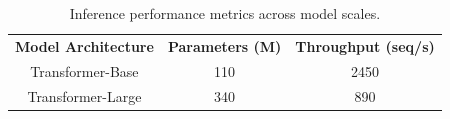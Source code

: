 \documentclass{article}
\begin{document}
\begin{table}[h]
\centering
\begin{tabular}{ccc}
\textbf{Model Architecture} & \textbf{Parameters (M)} & \textbf{Throughput (seq/s)} \\
Transformer-Base & 110 & 2450 \\
Transformer-Large & 340 & 890 \\
\end{tabular}
\caption{Inference performance metrics across model scales.}
\end{table}
\end{document}
